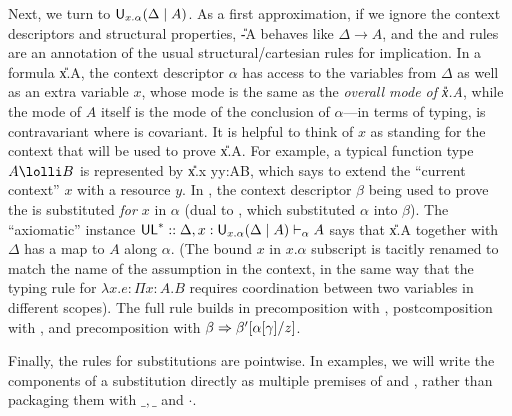 Next, we turn to $\mathsf{U}_{x.\alpha}(\Delta \mid A)$.  As a first approximation,
if we ignore the context descriptors and structural properties,
\U{-}{\Delta}{A} behaves like $\Delta \to A$, and the \UL\/ and \UR\/
rules are an annotation of the usual structural/cartesian rules for
implication.  In a formula \U{x.\alpha}{\Delta}{A}, the context
descriptor $\alpha$ has access to the variables from $\Delta$ as well as
an extra variable $x$, whose mode is the same as the \emph{overall mode
  of \U{x.\alpha}{\Delta}{A}}, while the mode of $A$ itself is the mode
of the conclusion of $\alpha$---in terms of typing,  is
contravariant where  is covariant.  It is helpful to think of $x$
as standing for the context that will be used to prove
\U{x.\alpha}{\Delta}{A}.  For example, a typical function type $A \lolli
B$ is represented by \U{x.x \otimes y}{y:A}{B}, which says to extend the
``current context'' $x$ with a resource $y$.  In \UR, the context
descriptor $\beta$ being used to prove the  is substituted
\emph{for $x$} in $\alpha$ (dual to \FL, which substituted $\alpha$ into
$\beta$).  The ``axiomatic'' \UL\/ instance
$\mathsf{UL}^* :: {\Delta,x:\mathsf{U}_{x.\alpha}(\Delta \mid A) \vdash_{\alpha} A}$
says that \U{x.\alpha}{\Delta}{A} together with $\Delta$ has a map to
$A$ along $\alpha$.  (The bound $x$ in $x.\alpha$ subscript is tacitly
renamed to match the name of the assumption in the context, in the same
way that the typing rule for $\lambda x.e : \Pi x:A.B$ requires
coordination between two variables in different scopes).  The full rule
builds in precomposition with \seq{\Gamma}{\gamma}{\Delta},
postcomposition with , and precomposition
with $\beta \Rightarrow \beta'[\alpha[\gamma]/z]$.

Finally, the rules for substitutions are pointwise.  In examples, we
will write the components of a substitution directly as multiple
premises of \FR\/ and \UL\/, rather than packaging them with 
$\_,\_$ and $\cdot$.


